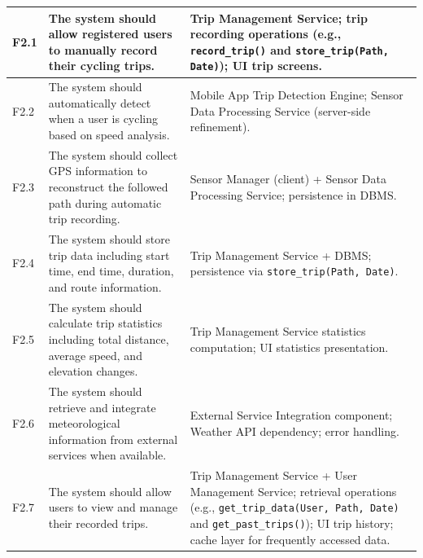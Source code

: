 \begin{longtable}{|p{}|p{}|p{}|}
    F2.1 & The system should allow registered users to manually record their cycling trips. &
    Trip Management Service; trip recording operations (e.g., \texttt{record\_trip()} and \texttt{store\_trip(Path, Date)}); UI trip screens. \\
    \hline
    F2.2 & The system should automatically detect when a user is cycling based on speed analysis. &
    Mobile App Trip Detection Engine; Sensor Data Processing Service (server-side refinement). \\
    \hline
    F2.3 & The system should collect GPS information to reconstruct the followed path during automatic trip recording. &
    Sensor Manager (client) + Sensor Data Processing Service; persistence in DBMS. \\
    \hline
    F2.4 & The system should store trip data including start time, end time, duration, and route information. &
    Trip Management Service + DBMS; persistence via \texttt{store\_trip(Path, Date)}. \\
    \hline
    F2.5 & The system should calculate trip statistics including total distance, average speed, and elevation changes. &
    Trip Management Service statistics computation; UI statistics presentation. \\
    \hline
    F2.6 & The system should retrieve and integrate meteorological information from external services when available. &
    External Service Integration component; Weather API dependency; error handling. \\
    \hline
    F2.7 & The system should allow users to view and manage their recorded trips. &
    Trip Management Service + User Management Service; retrieval operations (e.g., \texttt{get\_trip\_data(User, Path, Date)} and \texttt{get\_past\_trips()}); UI trip history; cache layer for frequently accessed data. \\
    \hline


\end{longtable}
